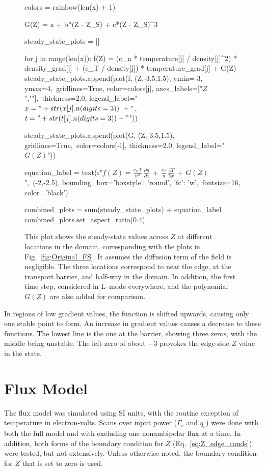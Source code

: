 \begin{figure}[tb]
\begin{sagesilent}
		colors = rainbow(len(x) + 1)

		G(Z) = a + b*(Z - Z_S) + c*(Z - Z_S)^3

		steady_state_plots = []

		for j in range(len(x)):
		    f(Z) = (c_n * temperature[j] / density[j]^2) * density_grad[j] + (c_T / density[j]) * temperature_grad[j] + G(Z)
		    steady_state_plots.append(plot(f, (Z,-3.5,1.5), ymin=-3, ymax=4,\
		    		gridlines=True, color=colors[j], axes_labels=["$Z$",""],\
		    		thickness=2.0, legend_label="$x = " +str(x[j].n(digits=3))\
		    		+"$, $t = " +str(t[j].n(digits=3))+ "$"))

		steady_state_plots.append(plot(G, (Z,-3.5,1.5), gridlines=True,\
				color=colors[-1], thickness=2.0, legend_label="$G(Z)$"))

		equation_label = text(r"$f(Z) = \frac{c_n \, T}{n^2} \, \frac{\partial n}{\partial x} \,+\, \frac{c_T}{n} \, \frac{\partial T}{\partial x} \,+\, G(Z)$",\
				(-2,-2.5), bounding_box={'boxstyle': 'round', 'fc': 'w'},\
				fontsize=16, color='black')

		combined_plots = sum(steady_state_plots) + equation_label
		combined_plots.set_aspect_ratio(0.4)
	\end{sagesilent}
	\sageplot[width=0.9\textwidth]{combined_plots}
	\caption{This plot shows the steady-state values across $Z$ at different locations in the domain, corresponding with the plots in Fig.~\ref{fig:Original_FS}.
	It assumes the diffusion term of the field is negligible.
	The three locations correspond to near the edge, at the transport barrier, and half-way in the domain.
	In addition, the first time step, considered in L--mode everywhere, and the polynomial $G(Z)$ are also added for comparison.}
	\label{fig:original_stationary_vs_Z}
\end{figure}

In regions of low gradient values, the function is shifted upwards, causing only one stable point to form.
An increase in gradient values causes a decrease to these functions.
The lowest line is the one at the barrier, showing three zeros, with the middle being unstable.
The left zero of about $-3$ provokes the edge-side $Z$ value in the state.

\section{Flux Model} \label{sec:flux_results}
The flux model was simulated using SI units, with the routine exception of temperature in electron-volts.
Scans over input power ($\Gamma_c$ and $q_c$) were done with both the full model and with excluding one nonambipolar flux at a time.
In addition, both forms of the boundary condition for $Z$ (Eq.~\ref{eq:Z_edge_conds}) were tested, but not extensively.
Unless otherwise noted, the boundary condition for $Z$ that is set to zero is used.

